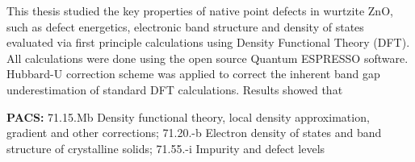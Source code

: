 This thesis studied the key properties of native point defects in wurtzite ZnO, such as  defect energetics, electronic band structure and density of states evaluated via first principle calculations using Density Functional Theory (DFT). All calculations were done using the open source Quantum ESPRESSO software. Hubbard-U correction scheme was applied to correct the inherent band gap underestimation of standard DFT calculations. Results showed that 

\begingroup
\noindent
\textbf{PACS:} 71.15.Mb Density functional theory, local density approximation, gradient and other corrections; 71.20.-b Electron density of states and band structure of crystalline solids; 71.55.-i Impurity and defect levels
\endgroup